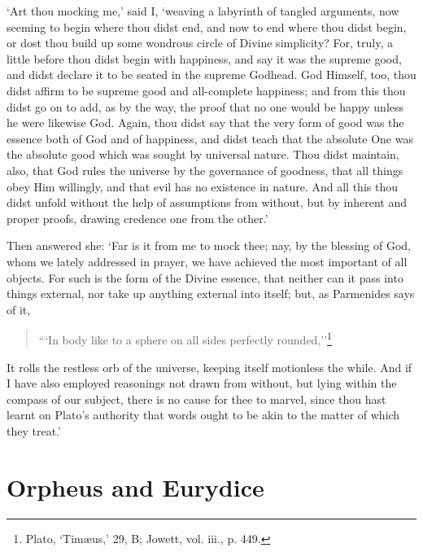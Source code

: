 \documentclass[11pt]{book}
\begin{document}
`Art thou mocking me,' said I, `weaving a labyrinth of tangled
arguments, now seeming to begin where thou didst end, and now to end
where thou didst begin, or dost thou build up some wondrous circle of
Divine simplicity? For, truly, a little before thou didst begin with
happiness, and say it was the supreme good, and didst declare it to be
seated in the supreme Godhead. God Himself, too, thou didst affirm to be
supreme good and all-complete happiness; and from this thou didst go on
to add, as by the way, the proof that no one would be happy unless he
were likewise God. Again, thou didst say that the very form of good was
the essence both of God and of happiness, and didst teach that the
absolute One was the absolute good which was sought by universal nature.
Thou didst maintain, also, that God rules the universe by the governance
of goodness, that all things obey Him willingly, and that evil has no
existence in nature. And all this thou didst unfold without the help of
assumptions from without, but by inherent and proper proofs, drawing
credence one from the other.'

Then answered she: `Far is it from me to mock thee; nay, by the blessing
of God, whom we lately addressed in prayer, we have achieved the most
important of all objects. For such is the form of the Divine essence,
that neither can it pass into things external, nor take up anything
external into itself; but, as Parmenides says of it,

\begin{quote}
  ```In body like to a sphere on all sides perfectly rounded,''\footnote{Plato, ‘Timæus,’ 29, B; Jowett, vol. iii., p. 449.}
\end{quote}

It rolls the restless orb of the universe, keeping itself motionless the
while. And if I have also employed reasonings not drawn from without,
but lying within the compass of our subject, there is no cause for thee
to marvel, since thou hast learnt on Plato's authority that words ought
to be akin to the matter of which they treat.'



\section{Orpheus and Eurydice}
\end{document}
